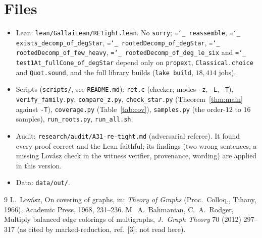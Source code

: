 \documentclass[11pt]{amsart}
\theoremstyle{definition}
\newcommand{\lean}[1]{\texttt{\hyphenchar\font=`\_ #1}}
\begin{document}
\section*{Files}
\begin{itemize}[leftmargin=*]
\item Lean: \texttt{lean/GallaiLean/RETight.lean}. No \texttt{sorry}; \lean{reassemble},
\lean{exists\_decomp\_of\_degStar}, \lean{rootedDecomp\_of\_degStar}, \lean{rootedDecomp\_of\_few\_heavy},
\lean{rootedDecomp\_of\_deg\_le\_six} and \lean{test1At\_fullCone\_of\_degStar} depend only on \texttt{propext}, \texttt{Classical.choice}
and \texttt{Quot.sound}, and the full library builds (\texttt{lake build}, $18{,}414$ jobs).
\item Scripts (\texttt{scripts/}, see \texttt{README.md}): \texttt{ret.c} (checker; modes \texttt{-z},
\texttt{-L}, \texttt{-T}), \texttt{verify\_family.py}, \texttt{compare\_z.py}, \texttt{check\_star.py}
(Theorem~\ref{thm:main} against \texttt{-T}), \texttt{coverage.py} (Table~\ref{tab:cov}),
\texttt{samples.py} (the order-$12$ to $16$ samples), \texttt{run\_roots.py}, \texttt{run\_all.sh}.
\item Audit: \texttt{research/audit/A31-re-tight.md} (adversarial referee). It found every proof
correct and the Lean faithful; its findings (two wrong sentences, a missing Lov\'asz check in the
witness verifier, provenance, wording) are applied in this version.
\item Data: \texttt{data/out/}.
\end{itemize}

\begin{thebibliography}{9}
 L.~Lov\'asz, On covering of graphs, in: \emph{Theory of Graphs} (Proc.\ Colloq.,
Tihany, 1966), Academic Press, 1968, 231--236.
 M.~A.~Bahmanian, C.~A.~Rodger, Multiply balanced edge colorings of multigraphs, \emph{J.\
Graph Theory} 70 (2012) 297--317 (as cited by marked-reduction, ref.~[3]; not read here).
\end{thebibliography}
\end{document}

